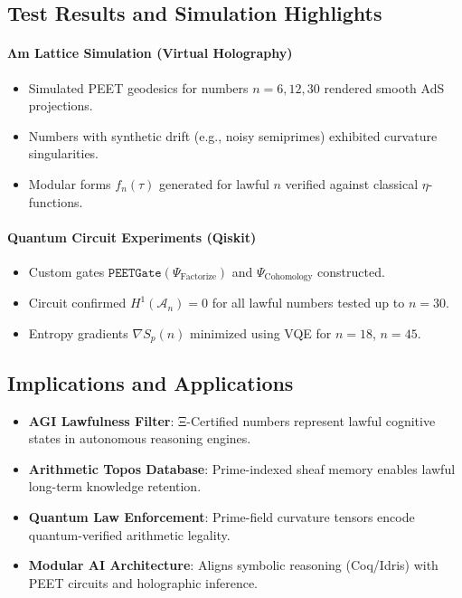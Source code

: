 \documentclass[12]{amsart}
\theoremstyle{plain}
\begin{document}
\subsection{Test Results and Simulation Highlights}

\paragraph{Λm Lattice Simulation (Virtual Holography)}
\begin{itemize}
  \item Simulated PEET geodesics for numbers $n = 6, 12, 30$ rendered smooth AdS projections.
  \item Numbers with synthetic drift (e.g., noisy semiprimes) exhibited curvature singularities.
  \item Modular forms $f_n(\tau)$ generated for lawful $n$ verified against classical $\eta$-functions.
\end{itemize}

\paragraph{Quantum Circuit Experiments (Qiskit)}
\begin{itemize}
  \item Custom gates $\texttt{PEETGate}(\Psi_{\text{Factorize}})$ and $\Psi_{\text{Cohomology}}$ constructed.
  \item Circuit confirmed $H^1(\mathcal{A}_n) = 0$ for all lawful numbers tested up to $n=30$.
  \item Entropy gradients $\nabla S_p(n)$ minimized using VQE for $n = 18$, $n = 45$.
\end{itemize}

\subsection{Implications and Applications}

\begin{itemize}
  \item \textbf{AGI Lawfulness Filter}: Ξ-Certified numbers represent lawful cognitive states in autonomous reasoning engines.
  \item \textbf{Arithmetic Topos Database}: Prime-indexed sheaf memory enables lawful long-term knowledge retention.
  \item \textbf{Quantum Law Enforcement}: Prime-field curvature tensors encode quantum-verified arithmetic legality.
  \item \textbf{Modular AI Architecture}: Aligns symbolic reasoning (Coq/Idris) with PEET circuits and holographic inference.
\end{itemize}
\end{document}
